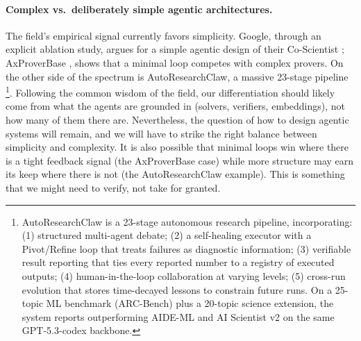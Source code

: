 \paragraph{Complex vs.\ deliberately simple agentic architectures.}
The field's empirical signal currently favors simplicity. Google, through an explicit ablation study, argues for a simple agentic design of their Co-Scientist \cite{Gottweis2026}; AxProverBase \cite{2602.24273}, shows that a minimal loop competes with complex provers. On the other side of the spectrum is AutoResearchClaw, a massive 23-stage pipeline \cite{2605.20025}\footnote{
    AutoResearchClaw is a 23-stage autonomous research pipeline, incorporating: (1) structured multi-agent debate; (2) a self-healing executor with a Pivot/Refine loop that treats failures as diagnostic information; (3) verifiable result reporting that ties every reported number to a registry of executed outputs; (4) human-in-the-loop collaboration at varying levels; (5) cross-run evolution that stores time-decayed lessons to constrain future runs.
    On a 25-topic ML benchmark (ARC-Bench) plus a 20-topic science extension, the system reports outperforming AIDE-ML and AI Scientist v2 on the same GPT-5.3-codex backbone.
    }.
Following the common wisdom of the field, our differentiation should likely come from what the agents are grounded in (solvers, verifiers, embeddings), not how many of them there are. Nevertheless, the question of how to design agentic systems will remain, and we will have to strike the right balance between simplicity and complexity.
It is also possible that minimal loops win where there is a tight feedback signal (the AxProverBase case) while more structure may earn its keep where there is not (the AutoResearchClaw example). This is something that we might need to verify, not take for granted.


